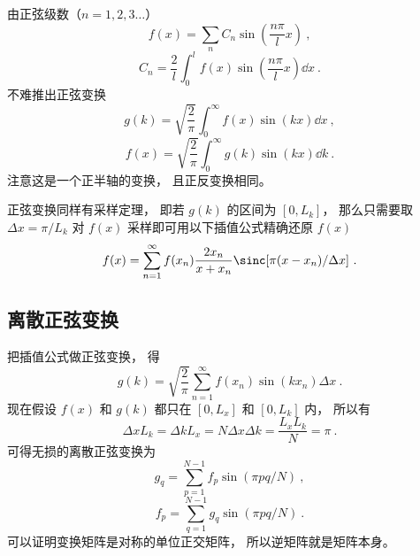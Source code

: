 

由正弦级数（$n = 1, 2, 3\dots$）
\begin{equation}
f(x) = \sum_n C_n \sin(\frac{n\pi}{l}x)~,
\end{equation}
\begin{equation}
C_n =  \frac2l \int_0^l f(x) \sin(\frac{n\pi}{l}x) \dd{x}~.
\end{equation}
不难推出正弦变换
\begin{equation}
g(k) = \sqrt{\frac{2}{\pi}} \int_0^{\infty} f(x) \sin(kx) \dd{x}~,
\end{equation}
\begin{equation}
f(x) = \sqrt{\frac{2}{\pi}} \int_0^{\infty} g(k) \sin(kx) \dd{k}~.
\end{equation}
注意这是一个正半轴的变换， 且正反变换相同。

正弦变换同样有采样定理， 即若 $g(k)$ 的区间为 $[0, L_k]$， 那么只需要取 $\Delta x = \pi/L_k$ 对 $f(x)$ 采样即可用以下插值公式精确还原 $f(x)$
\begin{equation}
f(x) = \sum_{n=1}^\infty f(x_n)\frac{2x_n}{x+x_n}\sinc[\pi(x-x_n)/\Delta x]~.
\end{equation} 

\subsection{离散正弦变换}
把插值公式做正弦变换， 得
\begin{equation}
g(k) = \sqrt{\frac{2}{\pi}} \sum_{n=1}^\infty f(x_n) \sin(k x_n) \Delta x~.
\end{equation}
现在假设 $f(x)$ 和 $g(k)$ 都只在 $[0, L_x]$ 和 $[0, L_k]$ 内， 所以有
\begin{equation}
\Delta x L_k = \Delta k L_x = N\Delta x\Delta k = \frac{L_xL_k}{N} = \pi~.
\end{equation}
可得无损的离散正弦变换为
\begin{equation}
g_q = \sum_{p = 1}^{N-1} f_p \sin(\pi pq/N)~,
\end{equation}
\begin{equation}
f_p = \sum_{q = 1}^{N-1} g_q \sin(\pi pq/N)~.
\end{equation}
可以证明变换矩阵是对称的单位正交矩阵， 所以逆矩阵就是矩阵本身。
